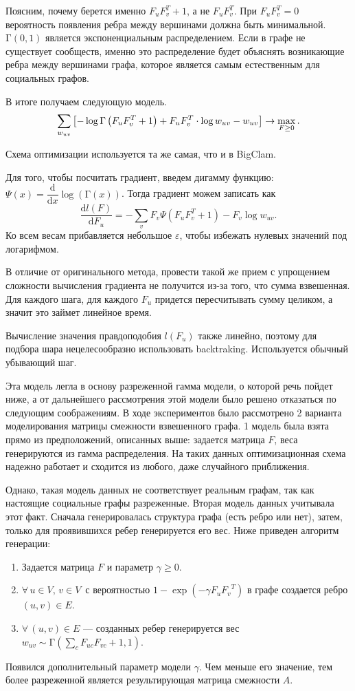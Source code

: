 \documentclass{ITaSconf}
\begin{document}
	Поясним, почему берется именно $F_u F_v^T + 1$, а не $F_u F_v^T$.
	При $F_u F_v^T=0$ вероятность появления ребра между вершинами должна быть минимальной.
	$\mathrm{\Gamma}(0, 1)$ является экспоненциальным распределением.
	Если в графе не существует сообществ, именно это распределение будет объяснять возникающие ребра между вершинами графа, которое является самым естественным для социальных графов.
	
	В итоге получаем следующую модель.
	$$
	\sum_{w_{uv}}\left[-\log\mathrm{\Gamma}\left( F_u F_v^T + 1 \right) + F_u F_v^T \cdot\log w_{uv} - w_{uv}\right] \rightarrow \max_{F\ge 0}.\\
	$$
	
	Схема оптимизации используется та же самая, что и в BigClam.
	
	Для того, чтобы посчитать градиент, введем дигамму функцию: $\Psi(x) = \dfrac{\mathrm{d}}{\mathrm{d}x} \log\left(\mathrm\Gamma(x)\right)$.
	Тогда градиент можем записать как
	$$\dfrac{\mathrm{d}l(F)}{\mathrm{d}F_u} = - \sum_v F_v \Psi\left(F_u F_v^T + 1\right) - F_v \log w_{uv}.$$
	Ко всем весам прибавляется небольшое $\varepsilon$, чтобы избежать нулевых значений под логарифмом.
	
	В отличие от оригинального метода, провести такой же прием с упрощением сложности вычисления градиента не получится из-за того, что сумма взвешенная.
	Для каждого шага, для каждого $F_u$ придется пересчитывать сумму целиком, а значит это займет линейное время.
	
	Вычисление значения правдоподобия $l(F_u)$ также линейно, поэтому для подбора шара нецелесообразно использовать backtraking.
	Используется обычный убывающий шаг.
	
	Эта модель легла в основу разреженной гамма модели, о которой речь пойдет ниже, а от дальнейшего рассмотрения этой модели было решено отказаться по следующим соображениям.
	В ходе экспериментов было рассмотрено 2 варианта моделирования матрицы смежности взвешенного графа.
	1 модель была взята прямо из предположений, описанных выше: задается матрица $F$, веса генерируются из гамма распределения.
	На таких данных оптимизационная схема надежно работает и сходится из любого, даже случайного приближения.
	
	Однако, такая модель данных не соответствует реальным графам, так как настоящие социальные графы разреженные.
	Вторая модель данных учитывала этот факт.
	Сначала генерировалась структура графа (есть ребро или нет), затем, только для проявившихся ребер генерируется его вес.
	Ниже приведен алгоритм генерации:
	\begin{enumerate}
		\item Задается матрица $F$ и параметр $\gamma \ge 0 $.
		\item $\forall\, u \in V, \, v \in V \,$ с вероятностью $1 - \exp(-\gamma F_u {F_v}^T)$ в графе создается ребро $(u, v) \in E$.
		\item $\forall\, (u, v) \in E$ --- созданных ребер генерируется вес $w_{uv} \sim \mathrm{\Gamma}\left(\sum_c F_{uc} F_{vc} + 1, 1\right)$.
	\end{enumerate}
	Появился дополнительный параметр модели $\gamma$.
	Чем меньше его значение, тем более разреженной является результирующая матрица смежности $A$.
	
\end{document}
